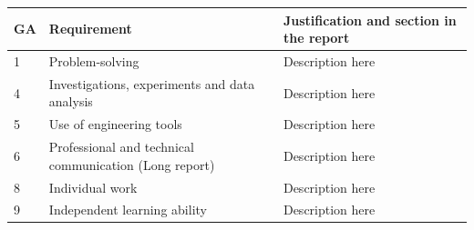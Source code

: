 \begin{center}
\begin{tabular}{||p{2em} |p{15em} |p{20em}||}
 \hline
 \textbf{GA} & \textbf{Requirement} & \textbf{Justification and section in the report}  \\ [0.5ex] 
 \hline\hline
 1 & Problem-solving & Description here  \\ 
 \hline
 4 & Investigations, experiments and data analysis & Description here  \\
 \hline
 5 & Use of engineering tools & Description here \\
 \hline
 6 & Professional and technical communication (Long report) & Description here \\
 \hline
 8 & Individual work & Description here \\
 \hline
 9 & Independent learning ability & Description here \\ [1ex] 
 \hline
\end{tabular}
\end{center}
